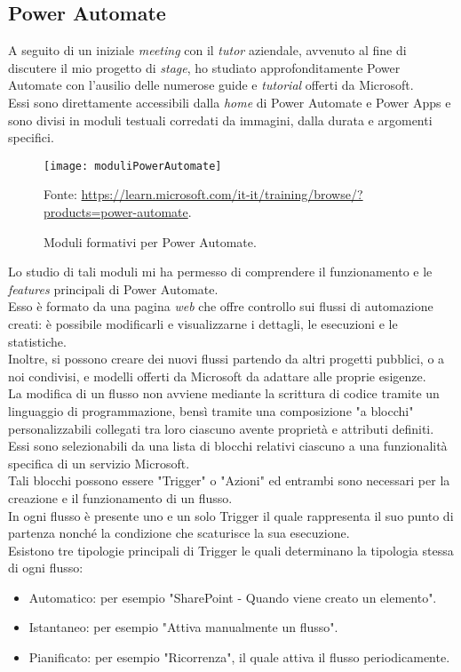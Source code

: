 \subsection{Power Automate}
A seguito di un iniziale \emph{meeting} con il \emph{tutor} aziendale, avvenuto al fine di discutere il mio progetto di \emph{stage}, ho studiato approfonditamente Power Automate con l'ausilio delle numerose guide e \emph{tutorial} offerti da Microsoft.\\
Essi sono direttamente accessibili dalla \emph{home} di Power Automate e Power Apps e sono divisi in moduli testuali corredati da immagini, dalla durata e argomenti specifici. 

\begin{figure}[htbp] 
    \centering 
    \texttt{[image: moduliPowerAutomate]} 
    \caption{Moduli formativi per Power Automate.}
    \label{fig:moduliPowerAutomate}
    \vspace{1mm}
    Fonte: \url{https://learn.microsoft.com/it-it/training/browse/?products=power-automate}.
\end{figure}

\newpage \noindent Lo studio di tali moduli mi ha permesso di comprendere il funzionamento e le \emph{features} principali di Power Automate.\\
Esso è formato da una pagina \emph{web} che offre controllo sui flussi di automazione creati: è possibile modificarli e visualizzarne i dettagli, le esecuzioni e le statistiche.\\
Inoltre, si possono creare dei nuovi flussi partendo da altri progetti pubblici, o a noi condivisi, e modelli offerti da Microsoft da adattare alle proprie esigenze.\\
La modifica di un flusso non avviene mediante la scrittura di codice tramite un linguaggio di programmazione, bensì tramite una composizione "a blocchi" personalizzabili collegati tra loro ciascuno avente proprietà e attributi definiti.\\
Essi sono selezionabili da una lista di blocchi relativi ciascuno a una funzionalità specifica di un servizio Microsoft.\\
Tali blocchi possono essere "Trigger" o "Azioni" ed entrambi sono necessari per la creazione e il funzionamento di un flusso.\\
In ogni flusso è presente uno e un solo Trigger il quale rappresenta il suo punto di partenza nonché la condizione che scaturisce la sua esecuzione.\\
Esistono tre tipologie principali di Trigger le quali determinano la tipologia stessa di ogni flusso:
\begin{itemize}
    \item Automatico: per esempio "SharePoint - Quando viene creato un elemento". 
    \item Istantaneo: per esempio "Attiva manualmente un flusso".
    \item Pianificato: per esempio "Ricorrenza", il quale attiva il flusso periodicamente.\\
\end{itemize}

